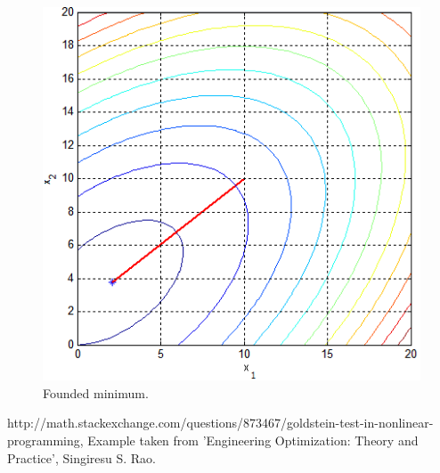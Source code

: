 \documentclass[12pt]{article}
\begin{document}
\begin{figure}[H]
	\includegraphics[width=16cm]{spirngs_results.png}
	\caption{Founded minimum.}
\end{figure}	


	
\begin{thebibliography}{99}
 http://math.stackexchange.com/questions/873467/goldstein-test-in-nonlinear-programming,
Example taken from 'Engineering Optimization: Theory and Practice', Singiresu S. Rao.
\end{thebibliography}
	
	
\end{document}
